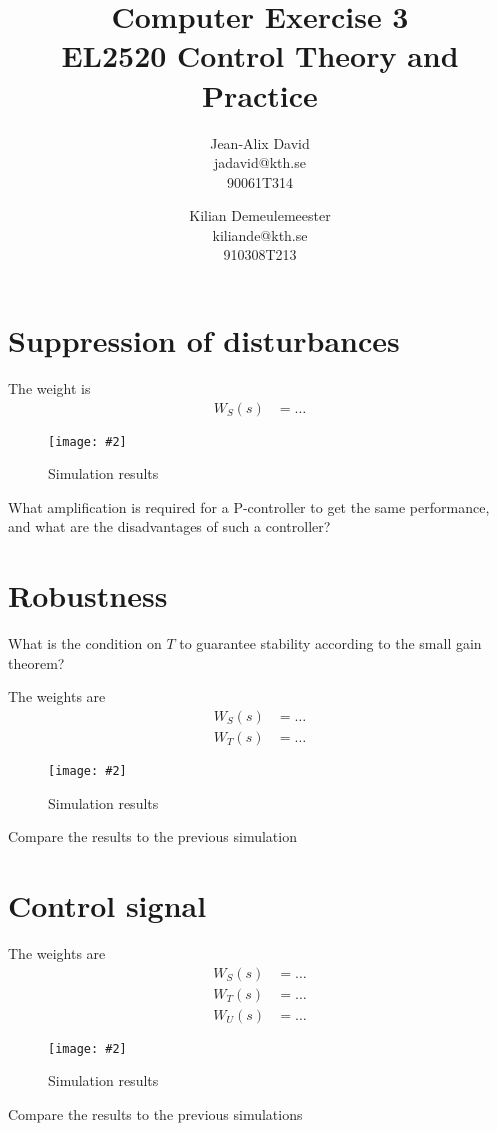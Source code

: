 \documentclass[a4paper,11pt]{article}
\title{
	Computer Exercise 3\\
	EL2520 Control Theory and Practice
}
\author{
	Jean-Alix David\\
	jadavid@kth.se\\
	90061T314
	\and
	Kilian Demeulemeester\\
	kiliande@kth.se\\
	910308T213
}
\newcommand{\image}[3][width=1.0\columnwidth]{
	\begin{figure}[h!]
		\centering
	    \texttt{[image: \#2]}
		\caption{#3}
		\label{fig:#2}
	\end{figure}
}
\begin{document}
	\maketitle

	\section*{Suppression of disturbances}

	The weight is
	\begin{align*}
		W_S(s) &= \ldots
	\end{align*}

	\image{figure_1.pdf}{Simulation results}

	What amplification is required for a P-controller to get the same performance, and what are the disadvantages of such a controller?
	\par\dotfill\par\dotfill\par


%

	\section*{Robustness}
	What is the condition on $T$ to guarantee stability according to the small gain theorem?
	\par\dotfill\par\dotfill\par
	The weights are
	\begin{align*}
		W_S(s) &= \ldots\\
		W_T(s) &= \ldots
	\end{align*}

	\image{figure_2.pdf}{Simulation results}

	Compare the results to the previous simulation
	\par\dotfill\par\dotfill\par

	\section*{Control signal}

	The weights are
	\begin{align*}
		W_S(s) &= \ldots\\
		W_T(s) &= \ldots\\
		W_U(s) &= \ldots
	\end{align*}

	\image{figure_3.pdf}{Simulation results}

	Compare the results to the previous simulations
	\par\dotfill\par\dotfill\par
\end{document}
